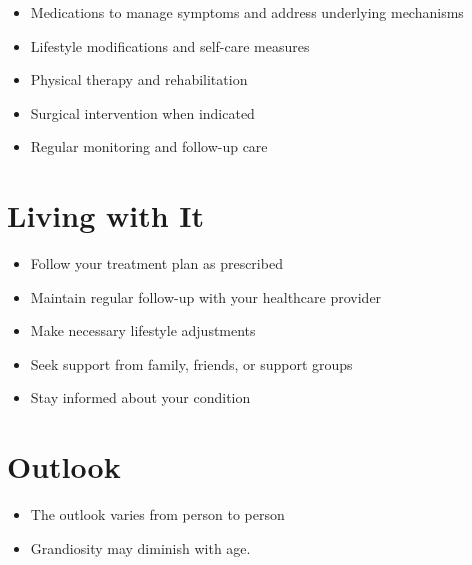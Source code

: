 \begin{itemize}[noitemsep]
  \item Medications to manage symptoms and address underlying mechanisms
  \item Lifestyle modifications and self-care measures
  \item Physical therapy and rehabilitation
  \item Surgical intervention when indicated
  \item Regular monitoring and follow-up care
\end{itemize}
\section{Living with It}
\begin{itemize}[noitemsep]
  \item Follow your treatment plan as prescribed
  \item Maintain regular follow-up with your healthcare provider
  \item Make necessary lifestyle adjustments
  \item Seek support from family, friends, or support groups
  \item Stay informed about your condition
\end{itemize}
\section{Outlook}
\begin{itemize}[noitemsep]
  \item The outlook varies from person to person
  \item Grandiosity may diminish with age.
\end{itemize}
